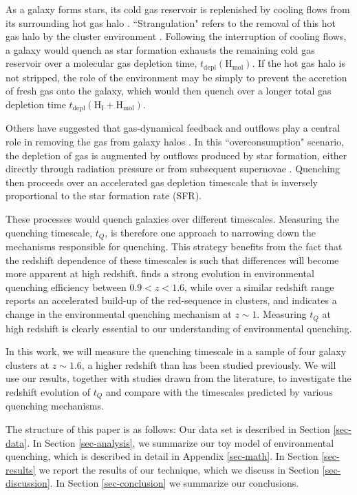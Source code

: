 As a galaxy forms stars, its cold gas reservoir is replenished by cooling flows from its surrounding hot gas halo \citep{Bauermeister:2010aa}.
``Strangulation" refers to the removal of this hot gas halo by the cluster environment \citep{Larson:1980aa,Merritt:1983aa,Byrd:1990aa}.
Following the interruption of cooling flows, a galaxy would quench as star formation exhausts the remaining cold gas reservoir over a molecular gas depletion time, $t_{\mathrm{depl}}(\mathrm{H_{mol}})$.
If the hot gas halo is not stripped, the role of the environment may be simply to prevent the accretion of fresh gas onto the galaxy, which would then quench over a longer total gas depletion time $t_{\mathrm{depl}}(\mathrm{H_I}+\mathrm{H_{mol}})$.

Others have suggested that gas-dynamical feedback and outflows play a central role in removing the gas from galaxy halos \citep{McGee:2014aa,Balogh:2016aa}.
In this ``overconsumption" scenario, the depletion of gas is augmented by outflows produced by star formation, either directly through radiation pressure or from subsequent supernovae \citet{McGee:2014aa}.
Quenching then proceeds over an accelerated gas depletion timescale that is inversely proportional to the star formation rate (SFR).

These processes would quench galaxies over different timescales.
Measuring the quenching timescale, $t_Q$, is therefore one approach to narrowing down the mechanisms responsible for quenching.
This strategy benefits from the fact that the redshift dependence of these timescales is such that differences will become more apparent at high redshift.
\citet{Nantais:2016aa,Nantais:2017aa} finds a strong evolution in environmental quenching efficiency between $0.9 < z < 1.6$, while over a similar redshift range \citet{Cerulo:2016aa,Cerulo:2017aa} reports an accelerated build-up of the red-sequence in clusters, and \citet{Balogh:2016aa} indicates a change in the environmental quenching mechanism at $z\sim1$.
Measuring $t_Q$ at high redshift is clearly essential to our understanding of environmental quenching.

In this work, we will measure the quenching timescale in a sample of four galaxy clusters at $z\sim1.6$, a higher redshift than has been studied previously.
We will use our results, together with studies drawn from the literature, to investigate the redshift evolution of $t_Q$ and compare with the timescales predicted by various quenching mechanisms.

The structure of this paper is as follows:
Our data set is described in Section \ref{sec-data}.
In Section \ref{sec-analysis}, we summarize our toy model of environmental quenching, which is described in detail in Appendix \ref{sec-math}.
In Section \ref{sec-results} we report the results of our technique, which we discuss in Section \ref{sec-discussion}.
In Section \ref{sec-conclusion} we summarize our conclusions.

